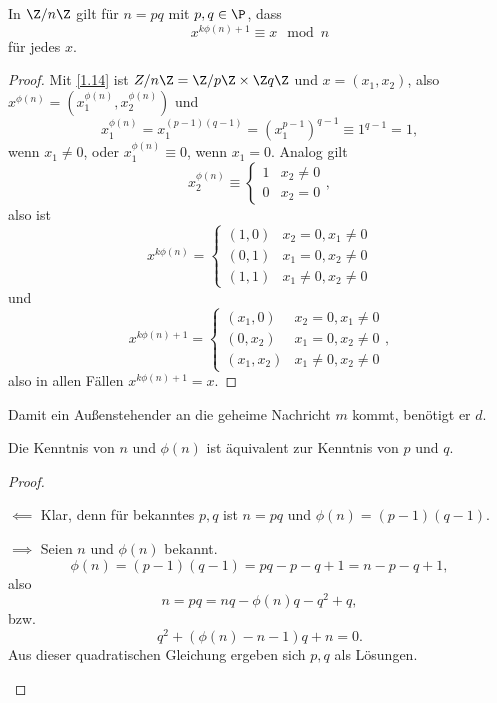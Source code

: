 \setcounter{thm}{1}
\begin{lem} \label{3.2}
	In $\Z / n \Z$ gilt für $n = pq$ mit $p,q \in \P$, dass
	\[
		x^{k\phi(n) + 1} \equiv x \mod n
	\]
	für jedes $x$.
	\begin{proof}
		Mit \ref{1.14} ist $Z / n\Z = \Z /p\Z \times \Z q\Z$ und $x = (x_1, x_2)$, also $x^{\phi(n)} = (x_1^{\phi(n)}, x_2^{\phi(n)})$ und
		\[
			x_1^{\phi(n)}
			= x_1^{(p-1)(q-1)}
			= (x_1^{p-1})^{q-1}
			\equiv 1^{q-1}
			= 1,
		\]
		wenn $x_1 \neq 0$, oder $x_1^{\phi(n)} \equiv 0$, wenn $x_1 = 0$.
		Analog gilt
		\[
			x_2^{\phi(n)} \equiv \begin{cases}
				1 & x_2 \neq 0 \\
				0 & x_2 = 0
			\end{cases},
		\]
		also ist
		\[
			x^{k\phi(n)} = \begin{cases}
				(1, 0) & x_2=0, x_1 \neq 0 \\
				(0,1) & x_1=0, x_2 \neq 0 \\
				(1,1) & x_1\neq 0, x_2 \neq 0
			\end{cases}
		\]
		und
		\[
			x^{k\phi(n) + 1} = \begin{cases}
				(x_1, 0) & x_2=0, x_1 \neq 0 \\
				(0,x_2) & x_1=0, x_2 \neq 0 \\
				(x_1,x_2) & x_1\neq 0, x_2 \neq 0
			\end{cases},
		\]
		also in allen Fällen $x^{k\phi(n) + 1} = x$.
	\end{proof}
\end{lem}

Damit ein Außenstehender an die geheime Nachricht $m$ kommt, benötigt er $d$.

\begin{lem} \label{3.3}
	Die Kenntnis von $n$ und $\phi(n)$ ist äquivalent zur Kenntnis von $p$ und $q$.
	\begin{proof}
		\begin{segnb}{$\impliedby$}
			Klar, denn für bekanntes $p, q$ ist $n = pq$ und $\phi(n) = (p-1)(q-1)$.
		\end{segnb}
		\begin{segnb}{$\implies$}
			Seien $n$ und $\phi(n)$ bekannt.
			\[
				\phi(n)
				= (p-1)(q-1)
				= pq - p - q + 1
				= n - p - q + 1,
			\]
			also
			\[
				n = pq = nq - \phi(n)q - q^2 + q,
			\]
			bzw.
			\[
				q^2 + (\phi(n) - n - 1)q + n = 0.
			\]
			Aus dieser quadratischen Gleichung ergeben sich $p, q$ als Lösungen.
		\end{segnb}
	\end{proof}
\end{lem}


